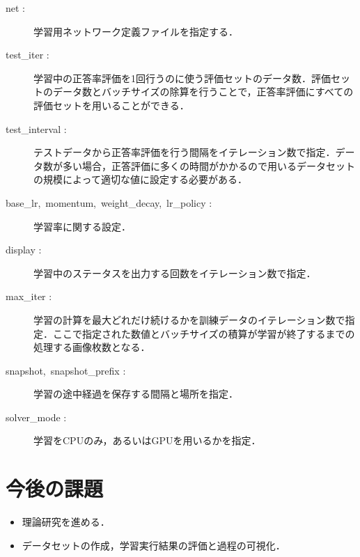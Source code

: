 \documentclass[a4paper,10pt]{jsarticle}
\begin{document}
\begin{description}
  \item[net :]学習用ネットワーク定義ファイルを指定する．
  \item[test\_iter :]学習中の正答率評価を1回行うのに使う評価セットのデータ数．評価セットのデータ数とバッチサイズの除算を行うことで，正答率評価にすべての評価セットを用いることができる．
  \item[test\_interval :]テストデータから正答率評価を行う間隔をイテレーション数で指定．データ数が多い場合，正答評価に多くの時間がかかるので用いるデータセットの規模によって適切な値に設定する必要がある．
  \item[base\_lr,\ momentum,\ weight\_decay,\ lr\_policy :]学習率に関する設定．
  \item[display :]学習中のステータスを出力する回数をイテレーション数で指定．
  \item[max\_iter :]学習の計算を最大どれだけ続けるかを訓練データのイテレーション数で指定．ここで指定された数値とバッチサイズの積算が学習が終了するまでの処理する画像枚数となる．
  \item[snapshot,\ snapshot\_prefix :]学習の途中経過を保存する間隔と場所を指定．
  \item[solver\_mode :]学習をCPUのみ，あるいはGPUを用いるかを指定．
\end{description}


\section{今後の課題}
\begin{itemize}
 \item 理論研究を進める．
 \item データセットの作成，学習実行結果の評価と過程の可視化．
\end{itemize}
\end{document}
